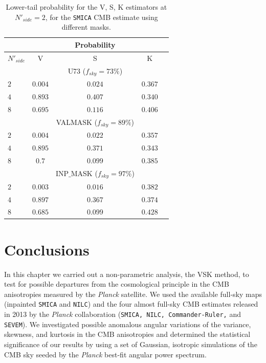 \begin{table}
\centering
\caption{Lower-tail probability for the V, S, K estimators at $N'_{side}=2$, for the \texttt{SMICA} CMB estimate using different masks.}
\label{table:3}
\begin{tabular}{@{}lcccc}
\hline 
  & & Probability & \\
\hline  
$N'_{side}$ & V & S & K \\ 
\hline  
 & & U73 ($f_{sky} = 73\%$) & \\
$2$ & $ 0.004 $ & $ 0.024 $ & $ 0.367 $ \\ 
$4$ & $ 0.893 $ & $ 0.407 $ & $ 0.340 $  \\
$8$ & $ 0.695 $ & $ 0.116 $ & $ 0.406 $  \\
 & & VALMASK ($f_{sky} = 89\%$) & \\
$2$ & $ 0.004 $ & $ 0.022 $ & $ 0.357 $ \\ 
$4$ & $ 0.895 $ & $ 0.371 $ & $ 0.343 $  \\
$8$ & $ 0.7 $ & $ 0.099 $ & $ 0.385 $  \\
 & & INP$\_$MASK ($f_{sky} = 97\%$) & \\
$2$ & $ 0.003 $ & $ 0.016 $ & $ 0.382 $ \\ 
$4$ & $ 0.897 $ & $ 0.367$ & $ 0.374 $  \\
$8$ & $ 0.685 $ & $ 0.099 $ & $ 0.428 $  \\
\hline
\end{tabular} 
\end{table}


\section{Conclusions}
\label{s:summary}

In this chapter we carried out a non-parametric analysis, the VSK method, to test for possible departures from the cosmological principle in the CMB anisotropies measured by the \textit{Planck} satellite. We used the available full-sky maps (inpainted \texttt{SMICA} and \texttt{NILC}) and the four almost full-sky CMB estimates released in 2013 by the \textit{Planck} collaboration (\texttt{SMICA, NILC, Commander-Ruler,} and \texttt{SEVEM}). We investigated possible anomalous angular variations of the variance, skewness, and kurtosis in the CMB anisotropies and determined the statistical significance of our results by using a set of Gaussian, isotropic simulations of the CMB sky seeded by the \textit{Planck} best-fit angular power spectrum.    

